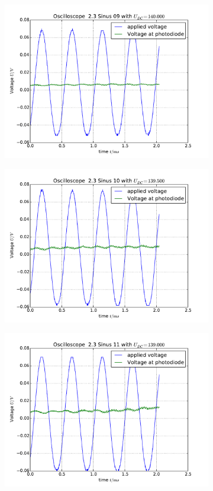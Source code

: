 \begin{figure}
\begin{subfigure}[b]{\picwidth}
        \includegraphics[width=\textwidth]{analysis/figures/23sinus09}
        \caption{}
    \end{subfigure}
    \begin{subfigure}[b]{\picwidth}
        \includegraphics[width=\textwidth]{analysis/figures/23sinus10}
        \caption{}
    \end{subfigure}
    \begin{subfigure}[b]{\picwidth}
        \includegraphics[width=\textwidth]{analysis/figures/23sinus11}

\end{subfigure}
\end{figure}

